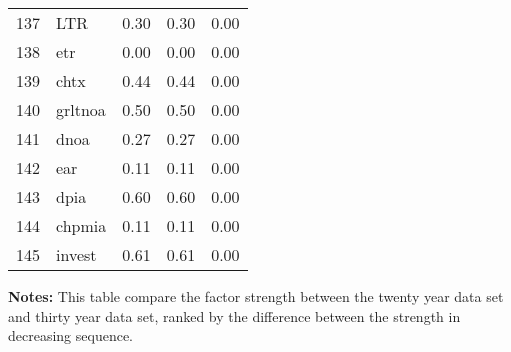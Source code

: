 \documentclass[12pt]{article}
\begin{document}
\begin{footnotesize}
\begin{longtable}{rl|c|c|c}
		137 & LTR & 0.30 & 0.30 & 0.00 \\ 
		138 & etr & 0.00 & 0.00 & 0.00 \\ 
		139 & chtx & 0.44 & 0.44 & 0.00 \\ 
		140 & grltnoa & 0.50 & 0.50 & 0.00 \\ 
		141 & dnoa & 0.27 & 0.27 & 0.00 \\ 
		142 & ear & 0.11 & 0.11 & 0.00 \\ 
		143 & dpia & 0.60 & 0.60 & 0.00 \\ 
		144 & chpmia & 0.11 & 0.11 & 0.00 \\ 
		145 & invest & 0.61 & 0.61 & 0.00 \\ 
		\hline
		
	\end{longtable}
{\bf Notes:}
This table compare the factor strength between the twenty year data set and thirty year data set, ranked by the difference between the strength in decreasing sequence.
\end{footnotesize}

\newpage
\end{document}
